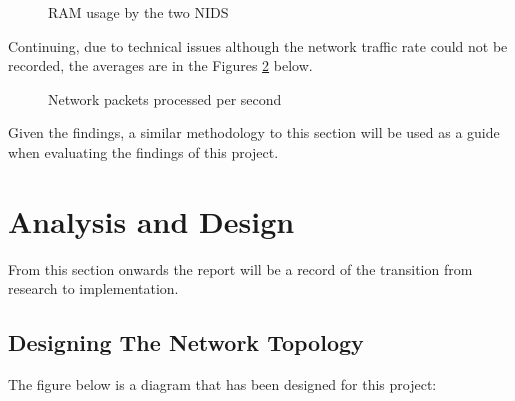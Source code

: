 \documentclass[12pt]{article}
\begin{document}
		\begin{center}
			\begin{figure}[H]
				\centering
				\qquad
				\caption{RAM usage by the two NIDS \cite{albin_2012_a}}%
				\label{fig:ram}%
			\end{figure}
		\end{center}
		
		
		Continuing, due to technical issues although the network traffic rate could not be recorded, the averages are in the Figures \ref{fig:rate} below.
		
		\begin{center}
			\begin{figure}[H]
				\centering
				\qquad
				\caption{Network packets processed per second \cite{albin_2012_a}}%
				\label{fig:rate}
			\end{figure}
			
			
			
		\end{center}
		Given the findings, a similar methodology to this section will be used as a guide when evaluating the findings of this project.
		
		
		
		
		
		
		
		
		
		
		\section{Analysis and Design
		}
		
		From this section onwards the report will be a record of the transition from research to implementation.
		
		\subsection{Designing The Network Topology}
		The figure below is a diagram that has been designed for this project:
		
\end{document}
